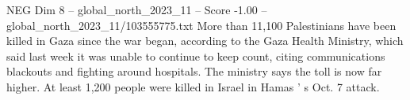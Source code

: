 \begin{textsample}{NEG Dim 8 – global\_north\_2023\_11 – Score -1.00 – global\_north\_2023\_11/103555775.txt}
More than 11,100 Palestinians have been killed in Gaza since the war began, according to the Gaza Health Ministry, which said last week it was unable to continue to keep count, citing communications blackouts and fighting around hospitals.
The ministry says the toll is now far higher.
At least 1,200 people were killed in Israel in Hamas ' s Oct. 7 attack.

\end{textsample}

